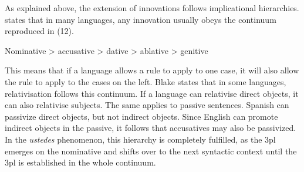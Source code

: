 \documentclass[output=paper]{LSP/langsci}
\begin{document}
\begin{table}[b]
\caption{Extension of the innovative 3pl in the \textit{ustedes} phenomenon} 
\label{tab:lara:10}
\end{table}

  
As explained above, the extension of innovations follows implicational hierarchies. \citet{blake_case_2004} states that in many languages, any innovation usually obeys the continuum reproduced in (12).

\begin{exe}
\ex Nominative {\textgreater} accusative {\textgreater} dative {\textgreater} ablative {\textgreater} genitive
\end{exe}

This means that if a language allows a rule to apply to one case, it will also allow the rule to apply to the cases on the left. Blake states that in some languages, relativisation follows this continuum. If a language can relativise direct objects, it can also relativise subjects. The same applies to passive sentences. Spanish can passivize direct objects, but not indirect objects. Since English can promote indirect objects in the passive, it follows that accusatives may also be passivized. In the \textit{ustedes} phenomenon, this hierarchy is completely fulfilled, as the 3pl emerges on the nominative and shifts over to the next syntactic context until the 3pl is established in the whole continuum.
\end{document}
